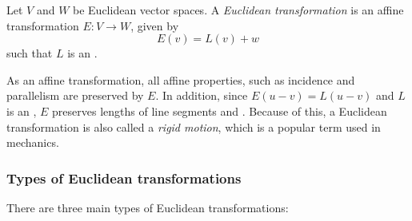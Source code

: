 \documentclass[12pt]{article}
\begin{document}

Let $V$ and $W$ be Euclidean vector spaces.  A \emph{Euclidean
transformation} is an affine transformation $E:V\to W$, given by
$$E(v)=L(v)+w$$ such that $L$ is an .

As an affine transformation, all affine properties, such as
incidence and parallelism are preserved by $E$.  In addition, since
$E(u-v)=L(u-v)$ and $L$ is an , $E$
preserves lengths of line segments and . Because of this, a Euclidean transformation is also called
a \emph{rigid motion}, which is a popular term used in mechanics.

\subsubsection*{Types of Euclidean transformations} There are three main
types of Euclidean transformations:
\end{document}
